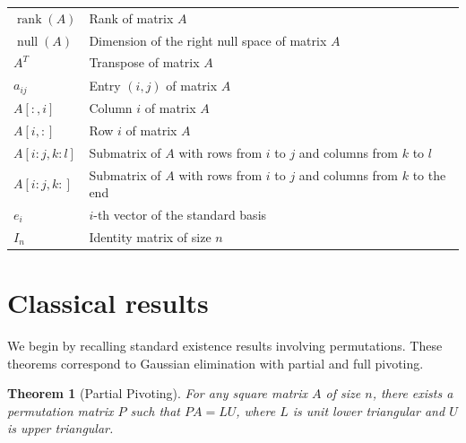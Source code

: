 \documentclass{article}
\DeclareMathOperator{\rk}{rank}
\DeclareMathOperator{\nl}{null}
\newtheorem{theorem}{Theorem}[section]
\begin{document}
\begin{tabular}{ll}
    \toprule
    $\rk(A)$     & Rank of matrix $A$ \\
    $\nl(A)$     & Dimension of the right null space of matrix $A$ \\
    $A^T$        & Transpose of matrix $A$ \\
    $a_{ij}$     & Entry $(i,j)$ of matrix $A$ \\
    $A[:,i]$     & Column $i$ of matrix $A$ \\
    $A[i,:]$     & Row $i$ of matrix $A$ \\
    $A[i:j,k:l]$ & Submatrix of $A$ with rows from $i$ to $j$ and columns from $k$ to $l$ \\
    $A[i:j,k:]$  & Submatrix of $A$ with rows from $i$ to $j$ and columns from $k$ to the end \\
    $e_i$        & $i$-th vector of the standard basis \\
    $I_n$        & Identity matrix of size $n$ \\
    \bottomrule
\end{tabular}

\section{Classical results}\label{sec:classical}

We begin by recalling standard existence results involving permutations. These theorems correspond to Gaussian elimination with partial and full pivoting.

\begin{theorem}[Partial Pivoting]\label{thm:row_permutation}
    For any square matrix $A$ of size $n$, there exists a permutation matrix $P$ such that $PA = LU$, where $L$ is unit lower triangular and $U$ is upper triangular.
\end{theorem}
\end{document}
